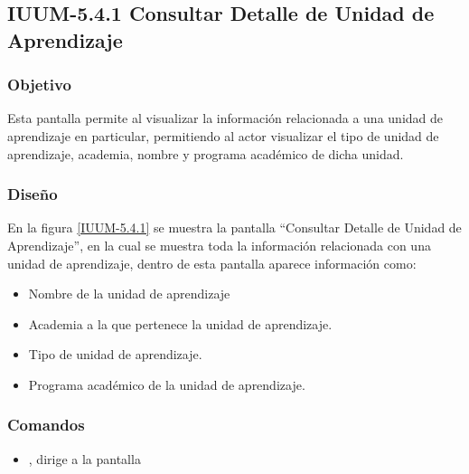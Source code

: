 \subsection{IUUM-5.4.1  Consultar  Detalle de Unidad de Aprendizaje}

\subsubsection{Objetivo}

	
    Esta pantalla permite al  visualizar la información relacionada a una unidad de aprendizaje en particular, permitiendo al actor visualizar el tipo de unidad de aprendizaje, academia, nombre y programa académico de dicha unidad.
\subsubsection{Diseño}


    En la figura \ref{IUUM-5.4.1} se muestra la pantalla ``Consultar Detalle de Unidad de Aprendizaje'', en la cual se muestra toda la información relacionada con una unidad de aprendizaje, dentro de esta pantalla aparece información como:
    \begin{itemize}
    	\item Nombre de la unidad de aprendizaje
    	\item Academia a la que pertenece la unidad de aprendizaje.
    	\item Tipo de unidad de aprendizaje.
    	\item Programa académico de la unidad de aprendizaje.
	\end{itemize} 



\subsubsection{Comandos}
    \begin{itemize}
	\item {}, dirige a la pantalla 
    \end{itemize}
